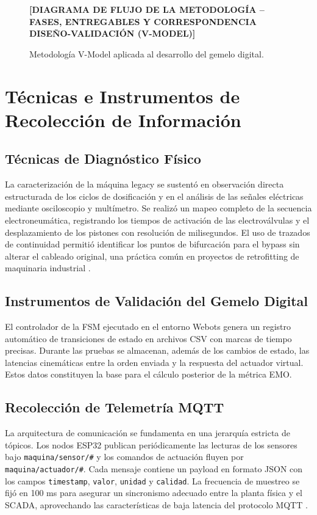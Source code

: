 \begin{figure}[htbp]
\centering
\textbf{[DIAGRAMA DE FLUJO DE LA METODOLOGÍA – FASES, ENTREGABLES Y CORRESPONDENCIA DISEÑO-VALIDACIÓN (V-MODEL)]}
\caption{Metodología V-Model aplicada al desarrollo del gemelo digital.}
\label{fig:diag_vmodel}
\end{figure}

\section{Técnicas e Instrumentos de Recolección de Información}

\subsection{Técnicas de Diagnóstico Físico}

La caracterización de la máquina legacy se sustentó en observación directa estructurada de los ciclos de dosificación y en el análisis de las señales eléctricas mediante osciloscopio y multímetro. Se realizó un mapeo completo de la secuencia electroneumática, registrando los tiempos de activación de las electroválvulas y el desplazamiento de los pistones con resolución de milisegundos. El uso de trazados de continuidad permitió identificar los puntos de bifurcación para el bypass sin alterar el cableado original, una práctica común en proyectos de retrofitting de maquinaria industrial \cite{retrofitting2025}.

\subsection{Instrumentos de Validación del Gemelo Digital}

El controlador de la FSM ejecutado en el entorno Webots genera un registro automático de transiciones de estado en archivos CSV con marcas de tiempo precisas. Durante las pruebas se almacenan, además de los cambios de estado, las latencias cinemáticas entre la orden enviada y la respuesta del actuador virtual. Estos datos constituyen la base para el cálculo posterior de la métrica EMO.

\subsection{Recolección de Telemetría MQTT}

La arquitectura de comunicación se fundamenta en una jerarquía estricta de tópicos. Los nodos ESP32 publican periódicamente las lecturas de los sensores bajo \texttt{maquina/sensor/\#} y los comandos de actuación fluyen por \texttt{maquina/actuador/\#}. Cada mensaje contiene un payload en formato JSON con los campos \texttt{timestamp}, \texttt{valor}, \texttt{unidad} y \texttt{calidad}. La frecuencia de muestreo se fijó en 100 ms para asegurar un sincronismo adecuado entre la planta física y el SCADA, aprovechando las características de baja latencia del protocolo MQTT \cite{oasis2014mqtt}.

